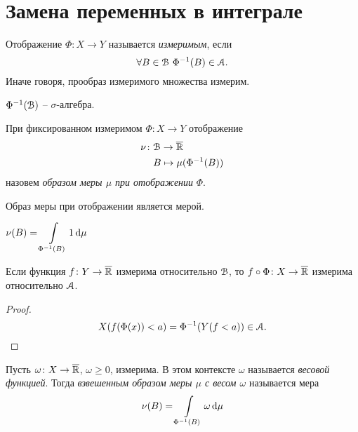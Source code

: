 \section{Замена переменных в интеграле}

\begin{definition}
    
    Отображение $\Phi \colon X \to Y$ называется \textit{измеримым}, если
\[
    \forall B \in \mathcal{B}~ \Phi^{-1}(B) \in \mathcal{A}
.\] 
    Иначе говоря, прообраз измеримого множества измерим.
\end{definition}

\begin{lemma}
    $\Phi^{-1}(\mathcal{B})$ -- $\sigma$-алгебра.
\end{lemma}

\begin{definition}
    При фиксированном измеримом $\Phi \colon X \to Y$ отображение
    \begin{align*}
        \nu \colon &\mathcal{B} \to \overline{\mathbb{R}} \\ 
                   &B \mapsto \mu(\Phi^{-1}(B))
    \end{align*}
    назовем \textit{образом меры $\mu$ при отображении} $\Phi$.
\end{definition}

\begin{lemma}
    Образ меры при отображении является мерой.
\end{lemma}

\begin{remark}
    $\displaystyle \nu(B) = \int\limits_{\Phi^{-1}(B)}{1 \,\mathrm{d}\mu}$
\end{remark}

\begin{lemma}
    Если функция $f \colon Y \to \overline{\mathbb{R}}$ измерима относительно $\mathcal{B}$, 
    то $f \circ \Phi \colon X \to \overline{\mathbb{R}}$ измерима относительно $\mathcal{A}$.
\end{lemma}
\begin{proof}
    \[
        X(f(\Phi(x)) < a) = \Phi^{-1}(Y(f < a)) \in \mathcal{A}
    .\]
\end{proof}

\begin{definition}
    Пусть $\omega \colon X \to \overline{\mathbb{R}}$, $\omega \geqslant 0$, измерима.
    В этом контексте $\omega$ называется \textit{весовой функцией}. Тогда
    \textit{взвешенным образом меры $\mu$ с весом $\omega$} называется мера
    \begin{align*}
        \nu(B) = \int\limits_{\Phi^{-1}(B)}{\omega \,\mathrm{d}\mu}    
    \end{align*}
\end{definition}

